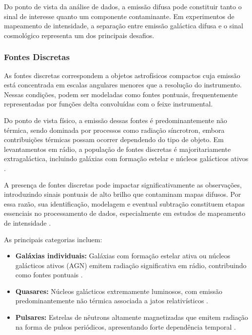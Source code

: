 Do ponto de vista da análise de dados, a emissão difusa pode constituir tanto o sinal de interesse quanto um componente contaminante. Em experimentos de mapeamento de intensidade, a separação entre emissão galáctica difusa e o sinal cosmológico representa um dos principais desafios.

\subsubsection{Fontes Discretas}

As fontes discretas correspondem a objetos astrofísicos compactos cuja emissão está concentrada em escalas angulares menores que a resolução do instrumento. Nessas condições, podem ser modeladas como fontes pontuais, frequentemente representadas por funções delta convoluídas com o feixe instrumental.

Do ponto de vista físico, a emissão dessas fontes é predominantemente não térmica, sendo dominada por processos como radiação síncrotron, embora contribuições térmicas possam ocorrer dependendo do tipo de objeto. Em levantamentos em rádio, a população de fontes discretas é majoritariamente extragaláctica, incluindo galáxias com formação estelar e núcleos galácticos ativos \cite{marins2023bingo}.

A presença de fontes discretas pode impactar significativamente as observações, introduzindo sinais pontuais de alto brilho que contaminam mapas difusos. Por essa razão, sua identificação, modelagem e eventual subtração constituem etapas essenciais no processamento de dados, especialmente em estudos de mapeamento de intensidade \cite{mericia2019hi}.

As principais categorias incluem:

\begin{itemize}
    \item \textbf{Galáxias individuais:} Galáxias com formação estelar ativa ou núcleos galácticos ativos (AGN) emitem radiação significativa em rádio, contribuindo como fontes pontuais \cite{marins2023bingo}.

    \item \textbf{Quasares:} Núcleos galácticos extremamente luminosos, com emissão predominantemente não térmica associada a jatos relativísticos \cite{nicolazzi2016agn}.

    \item \textbf{Pulsares:} Estrelas de nêutrons altamente magnetizadas que emitem radiação na forma de pulsos periódicos, apresentando forte dependência temporal \cite{condon2018era_ch6}.
\end{itemize}

